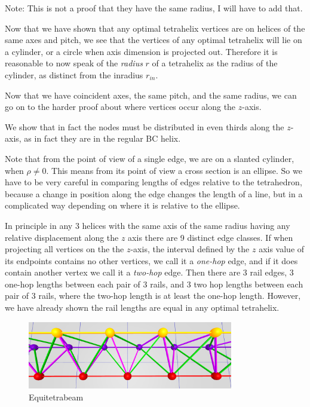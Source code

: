 \documentclass[review]{siamonline1116}
\begin{document}
Note: This is not a proof that they have the same radius, I will have to add that.

Now that we have shown that any optimal tetrahelix vertices
are on helices of the same axes and pitch, we see that the vertices 
of any optimal tetrahelix will lie on a cylinder, or a circle when axis dimension
is projected out. Therefore it is reasonable to now speak of the \emph{radius} $r$
of a tetrahelix as the radius of the cylinder, as distinct from the inradius $r_{in}$.

Now that we have coincident axes, the same pitch, and the same radius, we can go on to
 the harder proof about where vertices occur along the $z$-axis.

 We show that in fact the nodes must be distributed in even thirds
 along the $z$-axis, as in fact they are in the regular BC helix.

 Note that from the point of view of a single edge, we are on a
 slanted cylinder, when $\rho \neq 0$.  This means from its point of
 view a cross section is an ellipse. So we have to be very careful in
 comparing lengths of edges relative to the tetrahedron, because a
 change in position along the edge changes the length of a line, but
 in a complicated way depending on where it is relative to the
 ellipse.

 In principle in any 3 helices with the same axis of the same radius
 having any relative
 displacement along the $z$ axis there are 9 distinct edge classes.
 If when projecting all vertices on the the $z$-axis, the interval
 defined by the $z$ axis value of its endpoints contains no other vertices,
 we call it a \emph{one-hop} edge, and if it does contain another vertex we
 call it a \emph{two-hop} edge.
 Then there are 
 3 rail edges, 3 one-hop lengths between each pair of 3 rails, and 3 two hop
 lengths between each pair of 3 rails, where the two-hop length is at least
 the one-hop length.
 However, we have already shown the rail
 lengths are equal in any optimal tetrahelix.

\begin{figure}[H]
     \centering
     \includegraphics[width=0.8\textwidth]{figures/EquitetrabeamCloseUp.png}
     \caption{Equitetrabeam}
  \label{fig:equitetrabeam}
\end{figure}
\end{document}

